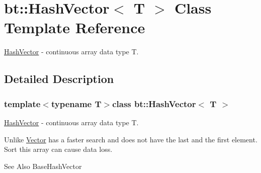 \hypertarget{classbt_1_1_hash_vector}{\section{bt\-:\-:Hash\-Vector$<$ T $>$ Class Template Reference}
\label{classbt_1_1_hash_vector}
}


\hyperlink{classbt_1_1_hash_vector}{Hash\-Vector} -\/ continuous array data type T.  




\subsection{Detailed Description}
\subsubsection*{template$<$typename T$>$class bt\-::\-Hash\-Vector$<$ T $>$}

\hyperlink{classbt_1_1_hash_vector}{Hash\-Vector} -\/ continuous array data type T. 

Unlike \hyperlink{classbt_1_1_vector}{Vector} has a faster search and does not have the last and the first element. Sort this array can cause data loss.

\begin{DoxySeeAlso}{See Also}
Base\-Hash\-Vector 
\end{DoxySeeAlso}
